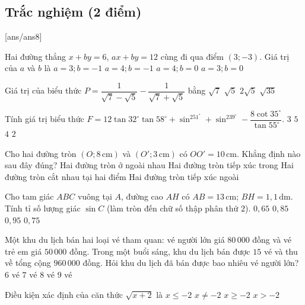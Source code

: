 \setcounter{ex}{0} %
\subsection{Trắc nghiệm (2 điểm)}
[ans/ans8]

\begin{ex}
Hai đường thẳng $x+by=6$, $ax+by=12$ cùng đi qua điểm $(3;-3)$. Giá trị của $a$ và $b$ là
\choice
{\True $a=3;b=-1$}
{$a=4;b=-1$}
{$a=4;b=0$}
{$a=3;b=0$}
\end{ex}

\begin{ex}
Giá trị của biểu thức $P=\dfrac{1}{\sqrt{7}-\sqrt{5}}-\dfrac{1}{\sqrt{7}+\sqrt{5}}$ bằng
\choice
{$\sqrt{7}$}
{\True $\sqrt{5}$}
{$2\sqrt{5}$}
{$\sqrt{35}$}
\end{ex}

\begin{ex}
Tính giá trị biểu thức
$F=12\tan32^\circ\tan58^\circ+\sin^251^\circ+\sin^239^\circ-\dfrac{8\cot35^\circ}{\tan55^\circ}$.
\vspace{0.35cm}
\choice
{$3$}
{\True $5$}
{$4$}
{$2$}
\end{ex}

\begin{ex}
Cho hai đường tròn $(O;8\,\text{cm})$ và $(O';3\,\text{cm})$ có $OO'=10\,\text{cm}$. Khẳng định nào sau đây đúng?
\choice
{Hai đường tròn ở ngoài nhau}
{Hai đường tròn tiếp xúc trong}
{\True Hai đường tròn cắt nhau tại hai điểm}
{Hai đường tròn tiếp xúc ngoài}
\end{ex}

\begin{ex}
Cho tam giác $ABC$ vuông tại $A$, đường cao $AH$ có $AB=13\,\text{cm}$; $BH=1{,}1\,\text{dm}$. Tính tỉ số lượng giác $\sin C$ (làm tròn đến chữ số thập phân thứ $2$).
\choice
{$0{,}65$}
{\True $0{,}85$}
{$0{,}95$}
{$0{,}75$}
\end{ex}

\begin{ex}
Một khu du lịch bán hai loại vé tham quan: vé người lớn giá $80\,000$ đồng và vé trẻ em giá $50\,000$ đồng. Trong một buổi sáng, khu du lịch bán được $15$ vé và thu về tổng cộng $960\,000$ đồng. Hỏi khu du lịch đã bán được bao nhiêu vé người lớn?
\choice
{$6$ vé}
{\True $7$ vé}
{$8$ vé}
{$9$ vé}
\end{ex}

\begin{ex}
Điều kiện xác định của căn thức $\sqrt{x+2}$ là
\choice
{$x\le -2$}
{$x\ne -2$}
{\True $x\ge -2$}
{$x>-2$}
\end{ex}

